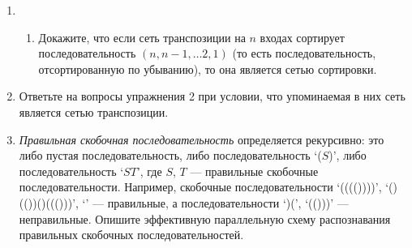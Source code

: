 \documentclass[11pt]{article}
\newenvironment{exercise}{\item}{}
\newcommand{\solution}[1]{}
\begin{document}
\begin{enumerate}
\begin{exercise}
\begin{enumerate}
\item Докажите, что если сеть транспозиции на $n$ входах сортирует последовательность
$(n, n-1, \ldots 2, 1)$ (то есть последовательность, отсортированную по убыванию),
то она является сетью сортировки.

\solution{Knuth v3 5.3.4 ex 36:
от противного. Пусть пара выходов не отсортирована, wlog 1, 0.
Рассмотрим пути.
Поменяем вход на 1111000.}

\end{enumerate}

\end{exercise}

\begin{exercise}
Ответьте на вопросы упражнения 2 при условии, что упоминаемая в них сеть является сетью транспозиции.

\solution{

а: тривиально

b: A minimal transposition sorting network is a shortest path from 12...n to n...21 in the Cayley graph 
of the symmetric group generated by adjacent transpositions.

Геометрия графа Кэли: пермутоэдр (перестановочный многогранник)

Все вершины лежат на $n-2$-мерной сфере (сумма координат и квадратов координат --- константа)

Недавно доказана гипотеза: случайная сортирующая сеть транспозиций в пределе стремится 
к большой полуокружности на этой сфере.

c: сортируем 654321. Пара переставилась лишним компаратором - дальше только лучше, сортирует.
}

\end{exercise}

\begin{exercise}

\emph{Правильная скобочная последовательность} определяется рекурсивно:
это либо пустая последовательность, либо последовательность `($S$)', либо последовательность `$ST$',
где $S$, $T$ --- правильные скобочные последовательности.
Например, скобочные последовательности `(((())))', `()(())()((()))', `' --- правильные, 
а последовательности `)(', `(()))' --- неправильные. 
Опишите эффективную параллельную схему распознавания правильных скобочных последовательностей.

\solution{Префиксные суммы на значениях $-1$, $1$.}

\end{exercise}


\end{enumerate}
\end{document}
